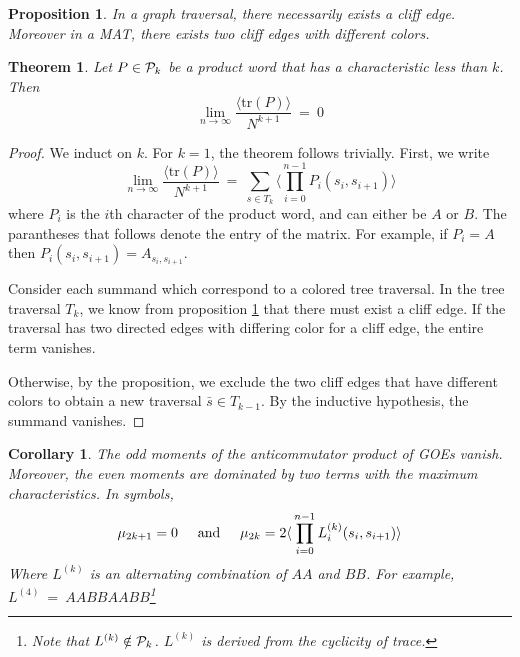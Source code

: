 \documentclass{article}
\def\<{{\langle}}
\def\>{{\rangle}}
\newcommand{\textAnd}{
    {
        \hspace{5mm}
        \textrm{and}
        \hspace{5mm}
    }
}
\newcommand{\tr}{
    {
        \textrm{tr}
    }
}
\newtheorem{theorem}{Theorem}
\newtheorem{proposition}{Proposition}
\newtheorem{corollary}{Corollary}
\begin{document}
\begin{proposition}
    \label{thm:cliff}
    In a graph traversal, there necessarily exists a cliff edge. Moreover 
    in a MAT, there exists two cliff edges with different colors. 
\end{proposition}

\begin{theorem}
    Let $P\in \mathcal{P}_{k}$ be a product word that has a characteristic 
    less than $k$. Then 
    \[
    \lim_{n \rightarrow \infty} \frac{\<\tr(P)\>} 
{N^{k + 1}} \ = \  0
    \]
\end{theorem}

\begin{proof}
    We induct on $k$. For $k = 1$, the theorem follows trivially. 
    First, we write 
\[\lim_{n \rightarrow \infty} \frac{\<\tr(P)\>} 
{N^{k + 1}} \ = \  
    \sum_{s\in T_k} \<\prod_{i = 0}^{n - 1} P_i({s_i, s_{i+1}})
    \> 
    \]
    where $P_i$ is the $i$th character of the product word, and can 
    either be $A$ or $B$. The parantheses that follows denote 
    the entry of the matrix. For example, if $P_i = A$ then 
    $P_i({s_i, s_{i+1}}) = A_{s_i, s_{i+1}}$. 

    Consider each summand which correspond to a colored tree traversal. 
    In the tree traversal $T_k$, we know from proposition \ref{thm:cliff}
    that there must exist a cliff edge. If the traversal has 
    two directed edges with differing color for a cliff edge, the 
    entire term vanishes. 

    Otherwise, by the proposition, we exclude the two cliff edges 
    that have different colors to obtain a new traversal $\bar s \in T_{k - 1}$. 
    By the inductive hypothesis, the summand vanishes.  
\end{proof}

\begin{corollary}
    \label{thm:AABB}
    The odd moments of the anticommutator product of GOEs vanish. 
    Moreover, the even moments are dominated by two terms with the 
    maximum characteristics. In symbols, 
    \begin{equation}
        \mu_{2k + 1} = 0 
        \textAnd 
        \mu_{2k} = 2 \<\prod_{i = 0}^{n - 1} L^{(k)}_i({s_i, s_{i+1}})\>
    \end{equation}
    Where $L^{(k)}$ is an alternating combination of $AA$ and $BB$. For example, 
    $L^{(4)} \ = \ AABBAABB$\footnote{Note that $L^{(k)} \notin \mathcal{P}_k$. $L^{(k)}$ is derived 
    from the cyclicity of trace. }

\end{corollary}
\end{document}
